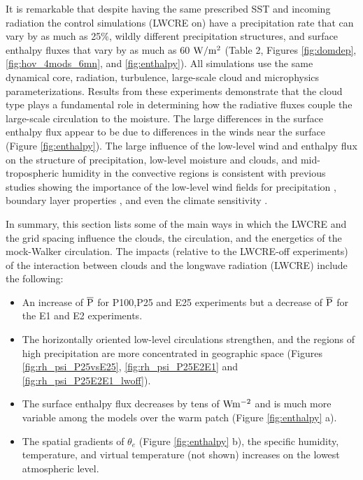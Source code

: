 \documentclass[draft]{agujournal2019}
\begin{document}
{It is remarkable that despite having the same prescribed SST and incoming radiation
the control simulations (LWCRE on) have a precipitation rate  that can vary by as much as 
25\%, wildly different precipitation structures, and surface enthalpy fluxes that vary by as much as 
60 $\rm{W/m^2}$ (Table 2, Figures \ref{fig:domdep}, \ref{fig:hov_4mods_6mn}, and \ref{fig:enthalpy}).
All simulations use the same dynamical core, radiation, turbulence, large-scale cloud and microphysics parameterizations.  
Results from these experiments demonstrate that the cloud type
plays a fundamental role in determining how the radiative fluxes couple
the large-scale circulation to the moisture.  The large differences in the surface enthalpy flux
appear to be due to differences in the winds near the surface (Figure \ref{fig:enthalpy}).  
The large influence of the low-level wind  and enthalpy flux on the structure of precipitation, 
low-level moisture and clouds, and mid-tropospheric humidity in the convective regions is 
consistent with previous studies showing the importance of the low-level wind fields for precipitation 
\cite{Wofsy_Kuang_2012, Fermepin_Bony_2014}, boundary layer properties \cite{Raymond_1994}, and even the climate 
sensitivity \cite{Silvers_etal_2016}.  

In summary, this section lists some of the main ways in which the LWCRE and the grid spacing influence
the clouds, the circulation, and the energetics of the mock-Walker circulation.   
The impacts (relative to the LWCRE-off experiments) of the interaction between clouds and the longwave radiation 
(LWCRE) include the following: 

\begin{itemize}
  \item {An increase of $\overline{\rm{P}}$  for P100,P25 and E25 experiments but a decrease of $\overline{\rm{P}}$  for the E1 and E2 experiments.}
  \item {The horizontally oriented low-level circulations strengthen, and the regions of high precipitation are more concentrated  
  in geographic space (Figures \ref{fig:rh_psi_P25vsE25}, \ref{fig:rh_psi_P25E2E1} and \ref{fig:rh_psi_P25E2E1_lwoff}).  }
  \item {The surface enthalpy flux decreases by tens of $\rm{W m^{-2}}$ and is much more variable among the models over the warm patch (Figure \ref{fig:enthalpy} a).}
  \item {The spatial gradients of $\theta_e$ (Figure \ref{fig:enthalpy} b), the specific humidity, temperature, and virtual temperature 
  (not shown) increases on the lowest atmospheric level.  }
 {    }
\end{itemize}






}
\end{document}
